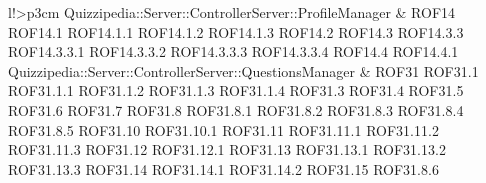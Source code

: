 \begin{tabella}{l!{\VRule}>{\centering\arraybackslash}p{3cm}}
Quizzipedia::Server::ControllerServer::ProfileManager & ROF14 \linebreak ROF14.1 \linebreak ROF14.1.1 \linebreak ROF14.1.2 \linebreak ROF14.1.3 \linebreak ROF14.2 \linebreak ROF14.3 \linebreak ROF14.3.3 \linebreak ROF14.3.3.1 \linebreak ROF14.3.3.2 \linebreak ROF14.3.3.3 \linebreak ROF14.3.3.4 \linebreak ROF14.4 \linebreak ROF14.4.1 \\
Quizzipedia::Server::ControllerServer::QuestionsManager & ROF31 \linebreak ROF31.1 \linebreak ROF31.1.1 \linebreak ROF31.1.2 \linebreak ROF31.1.3 \linebreak ROF31.1.4 \linebreak ROF31.3 \linebreak ROF31.4 \linebreak ROF31.5 \linebreak ROF31.6 \linebreak ROF31.7 \linebreak ROF31.8 \linebreak ROF31.8.1 \linebreak ROF31.8.2 \linebreak ROF31.8.3 \linebreak ROF31.8.4 \linebreak ROF31.8.5 \linebreak ROF31.10 \linebreak ROF31.10.1 \linebreak ROF31.11 \linebreak ROF31.11.1 \linebreak ROF31.11.2 \linebreak ROF31.11.3 \linebreak ROF31.12 \linebreak ROF31.12.1 \linebreak ROF31.13 \linebreak ROF31.13.1 \linebreak ROF31.13.2 \linebreak ROF31.13.3 \linebreak ROF31.14 \linebreak ROF31.14.1 \linebreak ROF31.14.2 \linebreak ROF31.15 \linebreak ROF31.8.6 \\

\end{tabella}
